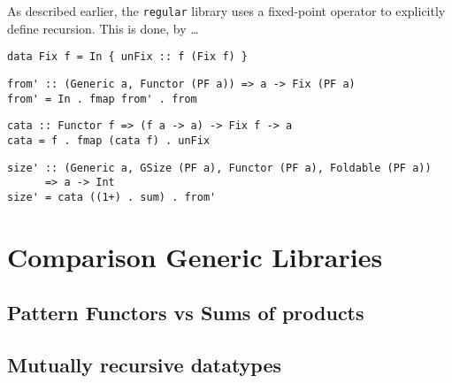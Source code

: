 As described earlier, the \texttt{regular} library uses a fixed-point operator to explicitly define recursion. This is done, by \dots

\begin{verbatim}
data Fix f = In { unFix :: f (Fix f) }
\end{verbatim}
    
\begin{verbatim}
from' :: (Generic a, Functor (PF a)) => a -> Fix (PF a)
from' = In . fmap from' . from
\end{verbatim}

\begin{verbatim}
cata :: Functor f => (f a -> a) -> Fix f -> a
cata = f . fmap (cata f) . unFix
\end{verbatim}

\begin{verbatim}
size' :: (Generic a, GSize (PF a), Functor (PF a), Foldable (PF a)) 
      => a -> Int
size' = cata ((1+) . sum) . from'
\end{verbatim}

\section{Comparison Generic Libraries}
\subsection{Pattern Functors vs Sums of products}

\subsection{Mutually recursive datatypes}
